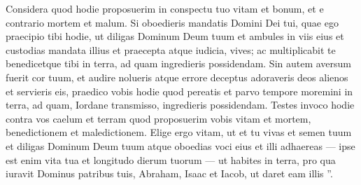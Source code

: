 \begin{biblechapter}
\begin{biblechapter}
\begin{biblechapter}
\begin{biblechapter}
\begin{biblechapter}
\begin{biblechapter}
\begin{biblechapter}
\begin{biblechapter}
\begin{biblechapter}
\begin{biblechapter}
\begin{biblechapter}
\begin{biblechapter}
\begin{biblechapter}
\begin{biblechapter}
\begin{biblechapter}
\begin{biblechapter}
\begin{biblechapter}
\begin{biblechapter}
\begin{biblechapter}
\begin{biblechapter}
\begin{biblechapter}
\begin{biblechapter}
\begin{biblechapter}
\begin{biblechapter}
\begin{biblechapter}
\begin{biblechapter}
\begin{biblechapter}
\begin{biblechapter}
\begin{biblechapter}
\begin{biblechapter}
 \verse Considera quod hodie proposuerim in conspectu tuo vitam et bonum, et e contrario mortem et malum. 
\verse Si oboedieris mandatis Domini Dei tui, quae ego praecipio tibi hodie, ut diligas Dominum Deum tuum et ambules in viis eius et custodias mandata illius et praecepta atque iudicia, vives; ac multiplicabit te benedicetque tibi in terra, ad quam ingredieris possidendam. 
\verse Sin autem aversum fuerit cor tuum, et audire nolueris atque errore deceptus adoraveris deos alienos et servieris eis, 
\verse praedico vobis hodie quod pereatis et parvo tempore moremini in terra, ad quam, Iordane transmisso, ingredieris possidendam.
 \verse Testes invoco hodie contra vos caelum et terram quod proposuerim vobis vitam et mortem, benedictionem et maledictionem. Elige ergo vitam, ut et tu vivas et semen tuum 
\verse et diligas Dominum Deum tuum atque oboedias voci eius et illi adhaereas — ipse est enim vita tua et longitudo dierum tuorum — ut habites in terra, pro qua iuravit Dominus patribus tuis, Abraham, Isaac et Iacob, ut daret eam illis ”.
 

\end{biblechapter}
\end{biblechapter}
\end{biblechapter}
\end{biblechapter}
\end{biblechapter}
\end{biblechapter}
\end{biblechapter}
\end{biblechapter}
\end{biblechapter}
\end{biblechapter}
\end{biblechapter}
\end{biblechapter}
\end{biblechapter}
\end{biblechapter}
\end{biblechapter}
\end{biblechapter}
\end{biblechapter}
\end{biblechapter}
\end{biblechapter}
\end{biblechapter}
\end{biblechapter}
\end{biblechapter}
\end{biblechapter}
\end{biblechapter}
\end{biblechapter}
\end{biblechapter}
\end{biblechapter}
\end{biblechapter}
\end{biblechapter}
\end{biblechapter}
